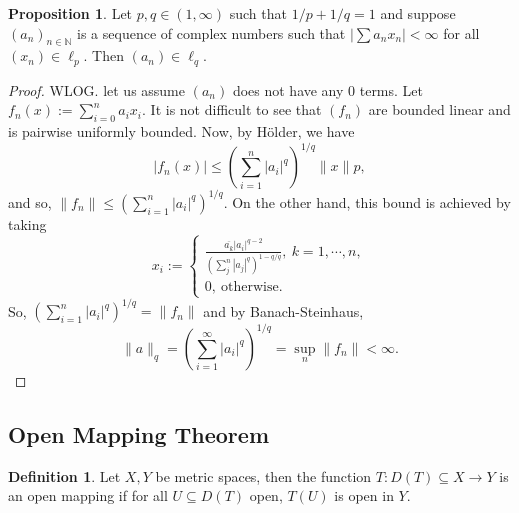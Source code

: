 \documentclass[]{article}
\theoremstyle{definition}
\theoremstyle{definition}
\newtheorem{definition}{Definition}[section]
\newtheorem{proposition}{Proposition}[section]
\begin{document}
\begin{proposition}
  Let \(p, q \in (1, \infty)\) 
  such that \(1 / p + 1 / q = 1\) and suppose \((a_n)_{n \in \mathbb{N}}\) 
  is a sequence of complex numbers such that 
  \(|\sum a_n x_n | < \infty\) for all \((x_n) \in \ell_p\).
  Then \((a_n) \in \ell_q\).
\end{proposition}
\begin{proof}
  WLOG. let us assume \((a_n)\) does not have any 0 terms.
  Let \(f_n(x) := \sum_{i = 0}^n a_i x_i\). It is not difficult to see that 
  \((f_n)\) are bounded linear and is pairwise uniformly bounded. Now, 
  by Hölder, we have 
  \[|f_n(x)| \le \left(\sum_{i = 1}^n |a_i|^q\right)^{1 / q} \|x\|p,\]
  and so,
  \(\|f_n\| \le \left(\sum_{i = 1}^n |a_i|^q\right)^{1 / q}\). On the other 
  hand, this bound is achieved by taking 
  \[x_i := \begin{cases}
    \frac{\overline{a_k}|a_i|^{q - 2}}{(\sum_j^n |a_j|^q)^{1 - q / q}}, 
    \ k = 1,\cdots, n,\\
    0, \ \text{otherwise}.
  \end{cases}\]
  So, \(\left(\sum_{i = 1}^n |a_i|^q\right)^{1 / q} = \|f_n\|\) and by 
  Banach-Steinhaus, 
  \[\|a\|_q = \left(\sum_{i = 1}^\infty |a_i|^q\right)^{1 / q} = 
    \sup_n \|f_n\| < \infty.\]
\end{proof}

\subsection{Open Mapping Theorem}

\begin{definition}
  Let \(X, Y\) be metric spaces, then the function \(T : D(T) \subseteq X \to Y\) 
  is an open mapping if for all \(U \subseteq D(T)\) open, \(T(U)\) is open 
  in \(Y\).
\end{definition}
\end{document}
